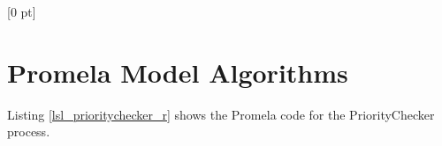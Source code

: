 \titlespacing{\chapter}{0 pt}{30 pt}{50 pt}[0 pt]
\titleformat{\section}{\Large\bfseries}{\thesection}{0 pt}{\hspace{30 pt}}
\titleformat{\subsection}{\large\bfseries}{\thesubsection}{0 pt}{\hspace{30 pt}}
\pagestyle{fancy}
\fancyhead[LO,LE]{\footnotesize\emph{\leftmark}}
\fancyhead[RO,RE]{\thepage}
\fancyfoot[CO,CE]{}

\chapter{Promela Model Algorithms} %


\normalsize
Listing  \ref{lsl_prioritychecker_r} shows the Promela code for the PriorityChecker process.\\

